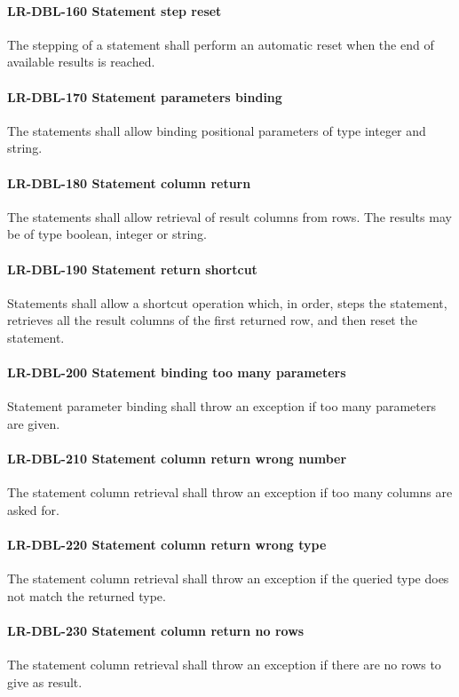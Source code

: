 \paragraph{LR-DBL-160 Statement step reset}
The stepping of a statement shall perform an automatic reset when
the end of available results is reached.

\paragraph{LR-DBL-170 Statement parameters binding}
The statements shall allow binding positional parameters of type
integer and string.

\paragraph{LR-DBL-180 Statement column return}
The statements shall allow retrieval of result columns from rows.
The results may be of type boolean, integer or string.

\paragraph{LR-DBL-190 Statement return shortcut}
Statements shall allow a shortcut operation which, in order, steps
the statement, retrieves all the result columns of the first returned
row, and then reset the statement.

\paragraph{LR-DBL-200 Statement binding too many parameters}
Statement parameter binding shall throw an exception if
too many parameters are given.

\paragraph{LR-DBL-210 Statement column return wrong number}
The statement column retrieval shall throw an exception if too many
columns are asked for.

\paragraph{LR-DBL-220 Statement column return wrong type}
The statement column retrieval shall throw an exception if the
queried type does not match the returned type.

\paragraph{LR-DBL-230 Statement column return no rows}
The statement column retrieval shall throw an exception if
there are no rows to give as result.

